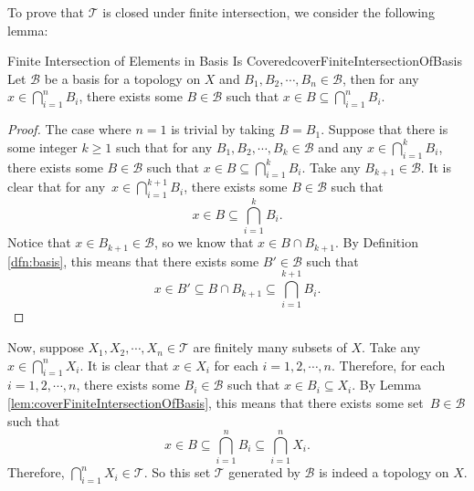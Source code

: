 \documentclass[math]{amznotes}
\theoremstyle{remark}
\begin{document}
To prove that $\mathcal{T}$ is closed under finite intersection, we consider the following lemma:
\begin{lembox}{Finite Intersection of Elements in Basis Is Covered}{coverFiniteIntersectionOfBasis}
    Let $\mathcal{B}$ be a basis for a topology on $X$ and $B_1, B_2, \cdots, B_n \in \mathcal{B}$, then for any $x \in \bigcap_{i = 1}^nB_i$, there exists some $B \in \mathcal{B}$ such that $x \in B \subseteq \bigcap_{i = 1}^nB_i$.
    \tcblower
    \begin{proof}
        The case where $n = 1$ is trivial by taking $B = B_1$. Suppose that there is some integer $k \geq 1$ such that for any $B_1, B_2, \cdots, B_k \in \mathcal{B}$ and any $x \in \bigcap_{i = 1}^kB_i$, there exists some $B \in \mathcal{B}$ such that $x \in B \subseteq \bigcap_{i = 1}^kB_i$. Take any $B_{k + 1} \in \mathcal{B}$. It is clear that for any~$x \in \bigcap_{i = 1}^{k + 1}B_i$, there exists some $B \in \mathcal{B}$ such that 
        \begin{equation*}
            x \in B \subseteq \bigcap_{i = 1}^kB_i.
        \end{equation*}
        Notice that $x \in B_{k + 1} \in \mathcal{B}$, so we know that $x \in B \cap B_{k + 1}$. By Definition \ref{dfn:basis}, this means that there exists some $B' \in \mathcal{B}$ such that 
        \begin{equation*}
            x \in B' \subseteq B \cap B_{k + 1} \subseteq \bigcap_{i = 1}^{k + 1}B_i.
        \end{equation*}
    \end{proof}
\end{lembox}
Now, suppose $X_1, X_2, \cdots, X_n \in \mathcal{T}$ are finitely many subsets of $X$. Take any $x \in \bigcap_{i = 1}^nX_i$. It is clear that $x \in X_i$ for each $i = 1, 2, \cdots, n$. Therefore, for each $i = 1, 2, \cdots, n$, there exists some $B_i \in \mathcal{B}$ such that $x \in B_i \subseteq X_i$. By Lemma \ref{lem:coverFiniteIntersectionOfBasis}, this means that there exists some set~$B \in \mathcal{B}$ such that 
\begin{equation*}
    x \in B \subseteq \bigcap_{i = 1}^nB_i \subseteq \bigcap_{i = 1}^nX_i.    
\end{equation*}
Therefore, $\bigcap_{i = 1}^nX_i \in \mathcal{T}$. So this set $\mathcal{T}$ generated by $\mathcal{B}$ is indeed a topology on $X$. 
\end{document}

